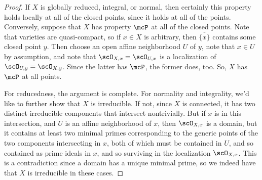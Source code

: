 \begin{proof}
	If $X$ is globally reduced, integral, or normal, then certainly this property holds locally at all of the closed points, since it holds at all of the points. Conversely, suppose that $X$ has property $\mcP$ at all of the closed points. Note that varieties are quasi-compact, so if $x \in X$ is arbitrary, then $\overline{\{x\}}$ contains some closed point $y$. Then choose an open affine neighborhood $U$ of $y$, note that $x \in U$ by assumption, and note that $\scO_{X,x} = \scO_{U,x}$ is a localization of $\scO_{U,y} = \scO_{X,y}$. Since the latter has $\mcP$, the former does, too. So, $X$ has $\mcP$ at all points.
	
	For reducedness, the argument is complete. For normality and integrality, we'd like to further show that $X$ is irreducible. If not, since $X$ is connected, it has two distinct irreducible components that intersect nontrivially. But if $x$ is in this intersection, and $U$ is an affine neighborhood of $x$, then $\scO_{X,x}$ is a domain, but it contains at least two minimal primes corresponding to the generic points of the two components intersecting in $x$, both of which must be contained in $U$, and so contained as prime ideals in $x$, and so surviving in the localization $\scO_{X,x}$. This is a contradiction since a domain has a unique minimal prime, so we indeed have that $X$ is irreducible in these cases.
\end{proof}
